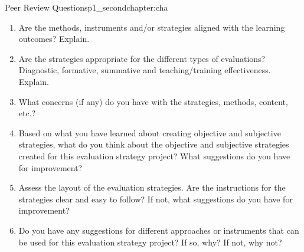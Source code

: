 
\begin{chapterpage}{Peer Review Questions}{p1_secondchapter:cha}

\end{chapterpage}

\begin{enumerate}
    \item 	Are the methods, instruments and/or strategies aligned with the learning outcomes? Explain.
    \item 	Are the strategies appropriate for the different types of evaluations? Diagnostic, formative, summative and teaching/training effectiveness. Explain.
    \item 	What concerns (if any) do you have with the strategies, methods, content, etc.?
    \item 	Based on what you have learned about creating objective and subjective strategies, what do you think about the objective and subjective strategies created for this evaluation strategy project? What suggestions do you have for improvement?
    \item 	Assess the layout of the evaluation strategies. Are the instructions for the strategies clear and easy to follow? If not, what suggestions do you have for improvement?
    \item 	Do you have any suggestions for different approaches or instruments that can be used for this evaluation strategy project? If so, why? If not, why not?
\end{enumerate}
